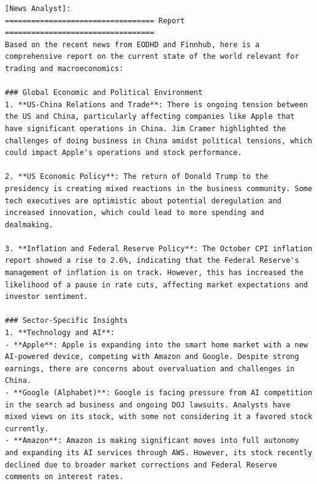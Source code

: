 \begin{tcolorbox}[
    breakable,
    enhanced,
    colback=lightblue!50!white,
    colframe=brightblue!30!gray,
    coltitle=black,
    boxrule=0.5pt,
    arc=0.5mm,
    top=2mm, bottom=2mm, left=2mm, right=2mm,
    fonttitle=\usefont{T1}{ppl}{b}{n},
    title=\model: News Analyst Team -- Apple (AAPL),
]
\footnotesize
\begin{lstlisting}[style=agentbase]
[News Analyst]:
================================== Report ==================================
Based on the recent news from EODHD and Finnhub, here is a comprehensive report on the current state of the world relevant for trading and macroeconomics:

### Global Economic and Political Environment
1. **US-China Relations and Trade**: There is ongoing tension between the US and China, particularly affecting companies like Apple that have significant operations in China. Jim Cramer highlighted the challenges of doing business in China amidst political tensions, which could impact Apple's operations and stock performance.

2. **US Economic Policy**: The return of Donald Trump to the presidency is creating mixed reactions in the business community. Some tech executives are optimistic about potential deregulation and increased innovation, which could lead to more spending and dealmaking.

3. **Inflation and Federal Reserve Policy**: The October CPI inflation report showed a rise to 2.6%, indicating that the Federal Reserve's management of inflation is on track. However, this has increased the likelihood of a pause in rate cuts, affecting market expectations and investor sentiment.

### Sector-Specific Insights
1. **Technology and AI**:
- **Apple**: Apple is expanding into the smart home market with a new AI-powered device, competing with Amazon and Google. Despite strong earnings, there are concerns about overvaluation and challenges in China.
- **Google (Alphabet)**: Google is facing pressure from AI competition in the search ad business and ongoing DOJ lawsuits. Analysts have mixed views on its stock, with some not considering it a favored stock currently.
- **Amazon**: Amazon is making significant moves into full autonomy and expanding its AI services through AWS. However, its stock recently declined due to broader market corrections and Federal Reserve comments on interest rates.


\end{lstlisting}
\end{tcolorbox}
